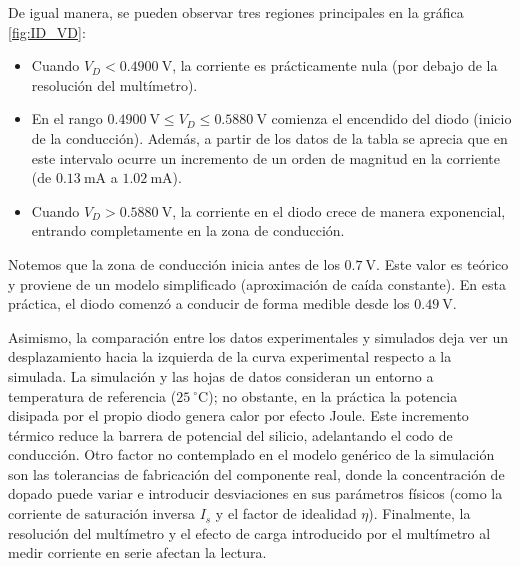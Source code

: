 \documentclass{article}
\begin{document}
De igual manera, se pueden observar tres regiones principales en la gráfica \ref{fig:ID_VD}:
\begin{itemize}
  \item Cuando $V_D < 0.4900~\text{V}$, la corriente es prácticamente nula (por debajo de la resolución del multímetro).
  \item En el rango $0.4900~\text{V} \le V_D \le 0.5880~\text{V}$ comienza el encendido del diodo (inicio de la conducción). Además, a partir de los datos de la tabla se aprecia que en este intervalo ocurre un incremento de un orden de magnitud en la corriente (de $0.13~\text{mA}$ a $1.02~\text{mA}$).
  \item Cuando $V_D > 0.5880~\text{V}$, la corriente en el diodo crece de manera exponencial, entrando completamente en la zona de conducción.
\end{itemize}

Notemos que la zona de conducción inicia antes de los $0.7~\text{V}$. Este valor es teórico y proviene de un modelo simplificado (aproximación de caída constante). En esta práctica, el diodo comenzó a conducir de forma medible desde los $0.49~\text{V}$.

Asimismo, la comparación entre los datos experimentales y simulados deja ver un desplazamiento hacia la izquierda de la curva experimental respecto a la simulada. 
La simulación y las hojas de datos consideran un entorno a temperatura de referencia ($25~^{\circ}\text{C}$); no obstante, en la práctica la potencia disipada por el propio diodo genera calor por efecto Joule. Este incremento térmico reduce la barrera de potencial del silicio, adelantando el codo de conducción. 
Otro factor no contemplado en el modelo genérico de la simulación son las tolerancias de fabricación del componente real, donde la concentración de dopado puede variar e introducir desviaciones en sus parámetros físicos (como la corriente de saturación inversa $I_s$ y el factor de idealidad $\eta$). 
Finalmente, la resolución del multímetro y el efecto de carga introducido por el multímetro al medir corriente en serie afectan la lectura.
\end{document}
